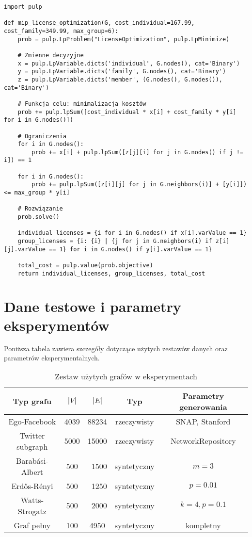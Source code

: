 \begin{verbatim}
import pulp

def mip_license_optimization(G, cost_individual=167.99, cost_family=349.99, max_group=6):
    prob = pulp.LpProblem("LicenseOptimization", pulp.LpMinimize)

    # Zmienne decyzyjne
    x = pulp.LpVariable.dicts('individual', G.nodes(), cat='Binary')
    y = pulp.LpVariable.dicts('family', G.nodes(), cat='Binary')
    z = pulp.LpVariable.dicts('member', (G.nodes(), G.nodes()), cat='Binary')

    # Funkcja celu: minimalizacja kosztów
    prob += pulp.lpSum([cost_individual * x[i] + cost_family * y[i] for i in G.nodes()])

    # Ograniczenia
    for i in G.nodes():
        prob += x[i] + pulp.lpSum([z[j][i] for j in G.nodes() if j != i]) == 1

    for i in G.nodes():
        prob += pulp.lpSum([z[i][j] for j in G.neighbors(i)] + [y[i]]) <= max_group * y[i]

    # Rozwiązanie
    prob.solve()

    individual_licenses = {i for i in G.nodes() if x[i].varValue == 1}
    group_licenses = {i: {i} | {j for j in G.neighbors(i) if z[i][j].varValue == 1} for i in G.nodes() if y[i].varValue == 1}

    total_cost = pulp.value(prob.objective)
    return individual_licenses, group_licenses, total_cost
\end{verbatim}

\section{Dane testowe i parametry eksperymentów}

Poniższa tabela zawiera szczegóły dotyczące użytych zestawów danych oraz parametrów eksperymentalnych.

\begin{table}[h]
\centering
\begin{tabular}{|c|c|c|c|c|}
\hline
\textbf{Typ grafu} & \(|V|\) & \(|E|\) & \textbf{Typ} & \textbf{Parametry generowania} \\
\hline
Ego-Facebook & 4039 & 88234 & rzeczywisty & SNAP, Stanford \\
Twitter subgraph & 5000 & 15000 & rzeczywisty & NetworkRepository \\
Barabási-Albert & 500 & ~1500 & syntetyczny & \(m=3\) \\
Erdős-Rényi & 500 & ~1250 & syntetyczny & \(p=0.01\) \\
Watts-Strogatz & 500 & ~2000 & syntetyczny & \(k=4, p=0.1\) \\
Graf pełny & 100 & 4950 & syntetyczny & kompletny \\
\hline
\end{tabular}
\caption{Zestaw użytych grafów w eksperymentach}
\end{table}

